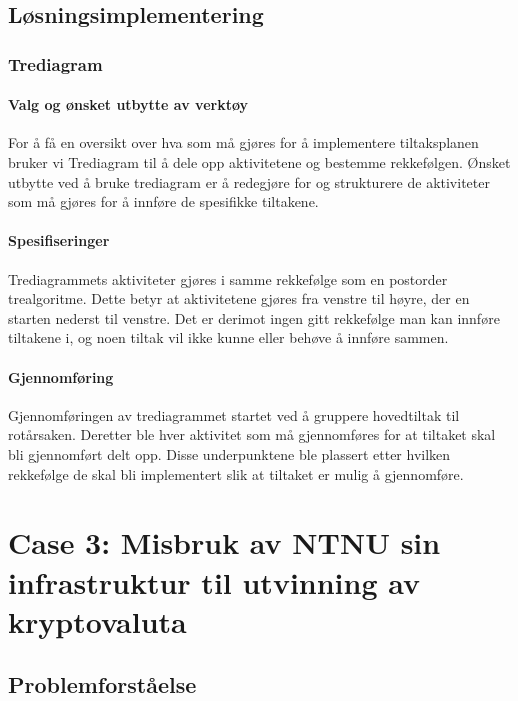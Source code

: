 \subsection{Løsningsimplementering}

\subsubsection{Trediagram}

\paragraph{Valg og ønsket utbytte av verktøy}
For å få en oversikt over hva som må gjøres for å implementere tiltaksplanen bruker vi Trediagram til å dele opp aktivitetene og bestemme rekkefølgen. Ønsket utbytte ved å bruke trediagram er å redegjøre for og strukturere de aktiviteter som må gjøres for å innføre de spesifikke tiltakene. 

\paragraph{Spesifiseringer}
Trediagrammets aktiviteter gjøres i samme rekkefølge som en postorder trealgoritme. Dette betyr at aktivitetene gjøres fra venstre til høyre, der en starten nederst til venstre. Det er derimot ingen gitt rekkefølge man kan innføre tiltakene i, og noen tiltak vil ikke kunne eller behøve å innføre sammen. 

\paragraph{Gjennomføring}
Gjennomføringen av trediagrammet startet ved å gruppere hovedtiltak til rotårsaken. Deretter ble hver aktivitet som må gjennomføres for at tiltaket skal bli gjennomført delt opp. Disse underpunktene ble plassert etter hvilken rekkefølge de skal bli implementert slik at tiltaket er mulig å gjennomføre. 


\newpage
\section{Case 3: Misbruk av NTNU sin infrastruktur til utvinning av kryptovaluta}

\subsection{Problemforståelse}
